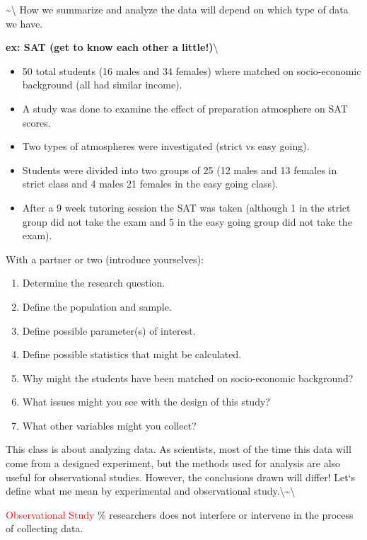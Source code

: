 \documentclass[]{book}
\begin{document}
\textasciitilde{}\textbackslash{} How we summarize and analyze the data
will depend on which type of data we have.

\newpage

\textbf{ex: SAT (get to know each other a little!)}\textbackslash{}

\begin{itemize}
\item 50 total students (16 males and 34 females) where matched on socio-economic background (all had similar income). 
\item A study was done to examine the effect of preparation atmosphere on SAT scores.  
\item Two types of atmospheres were investigated (strict vs easy going).
\item Students were divided into two groups of 25 (12 males and 13 females in strict class and 4 males 21 females in the easy going class).
\item After a 9 week tutoring session the SAT was taken (although 1 in the strict group did not take the exam and 5 in the easy going group did not take the exam).
\end{itemize}

With a partner or two (introduce yourselves):

\begin{enumerate}
\item Determine the research question.
\item Define the population and sample.
\item Define possible parameter(s) of interest.
\item Define possible statistics that might be calculated.
\item Why might the students have been matched on socio-economic background?
\item What issues might you see with the design of this study?
\item What other variables might you collect?
\end{enumerate}

\normalsize This class is about analyzing data. As scientists, most of
the time this data will come from a designed experiment, but the methods
used for analysis are also useful for observational studies. However,
the conclusions drawn will differ! Let`s define what me mean by
experimental and observational
study.\textbackslash{}\textasciitilde{}\textbackslash{}

\textcolor{red}{Observational Study}
\%\underbar{~~~~~~~~~~~~~~~~~~~~~~~~~~~~~~~~~~~~} researchers does not
interfere or intervene in the process of collecting data.
\end{document}
